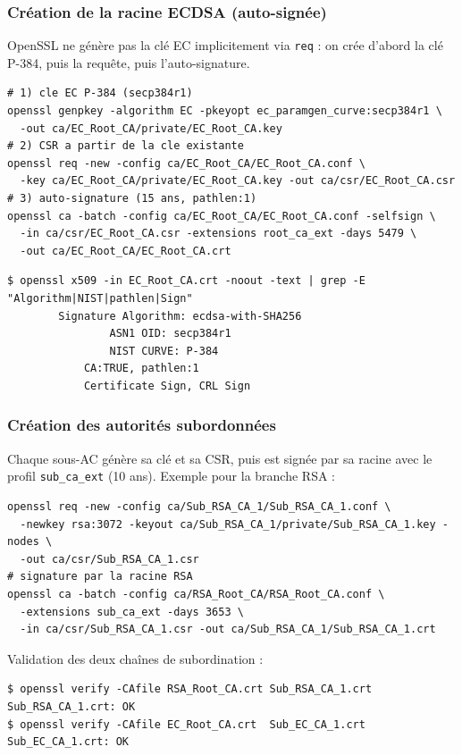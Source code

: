 \documentclass[11pt,a4paper]{article}
\begin{document}
\subsubsection{Création de la racine ECDSA (auto-signée)}
OpenSSL ne génère pas la clé EC implicitement via \texttt{req} : on crée d'abord la clé
P-384, puis la requête, puis l'auto-signature.
\begin{lstlisting}[style=cmd]
# 1) cle EC P-384 (secp384r1)
openssl genpkey -algorithm EC -pkeyopt ec_paramgen_curve:secp384r1 \
  -out ca/EC_Root_CA/private/EC_Root_CA.key
# 2) CSR a partir de la cle existante
openssl req -new -config ca/EC_Root_CA/EC_Root_CA.conf \
  -key ca/EC_Root_CA/private/EC_Root_CA.key -out ca/csr/EC_Root_CA.csr
# 3) auto-signature (15 ans, pathlen:1)
openssl ca -batch -config ca/EC_Root_CA/EC_Root_CA.conf -selfsign \
  -in ca/csr/EC_Root_CA.csr -extensions root_ca_ext -days 5479 \
  -out ca/EC_Root_CA/EC_Root_CA.crt
\end{lstlisting}
\begin{lstlisting}[style=out]
$ openssl x509 -in EC_Root_CA.crt -noout -text | grep -E "Algorithm|NIST|pathlen|Sign"
        Signature Algorithm: ecdsa-with-SHA256
                ASN1 OID: secp384r1
                NIST CURVE: P-384
            CA:TRUE, pathlen:1
            Certificate Sign, CRL Sign
\end{lstlisting}

\subsubsection{Création des autorités subordonnées}
Chaque sous-AC génère sa clé et sa CSR, puis est signée par sa racine avec le profil
\texttt{sub\_ca\_ext} (10 ans). Exemple pour la branche RSA :
\begin{lstlisting}[style=cmd]
openssl req -new -config ca/Sub_RSA_CA_1/Sub_RSA_CA_1.conf \
  -newkey rsa:3072 -keyout ca/Sub_RSA_CA_1/private/Sub_RSA_CA_1.key -nodes \
  -out ca/csr/Sub_RSA_CA_1.csr
# signature par la racine RSA
openssl ca -batch -config ca/RSA_Root_CA/RSA_Root_CA.conf \
  -extensions sub_ca_ext -days 3653 \
  -in ca/csr/Sub_RSA_CA_1.csr -out ca/Sub_RSA_CA_1/Sub_RSA_CA_1.crt
\end{lstlisting}
Validation des deux chaînes de subordination :
\begin{lstlisting}[style=out]
$ openssl verify -CAfile RSA_Root_CA.crt Sub_RSA_CA_1.crt
Sub_RSA_CA_1.crt: OK
$ openssl verify -CAfile EC_Root_CA.crt  Sub_EC_CA_1.crt
Sub_EC_CA_1.crt: OK
\end{lstlisting}
\end{document}
